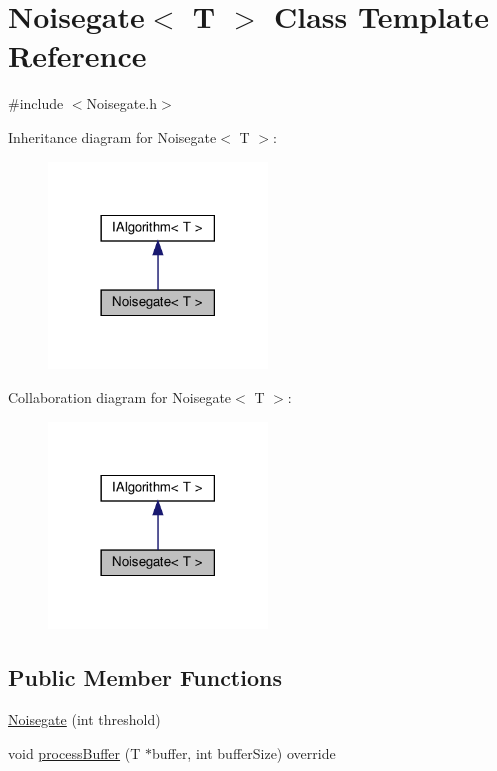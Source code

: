 \hypertarget{classNoisegate}{}\section{Noisegate$<$ T $>$ Class Template Reference}
\label{classNoisegate}


{\ttfamily \#include $<$Noisegate.\+h$>$}



Inheritance diagram for Noisegate$<$ T $>$\+:
\nopagebreak
\begin{figure}[H]
\begin{center}
\leavevmode
\includegraphics[width=165pt]{dc/d99/classNoisegate__inherit__graph}
\end{center}
\end{figure}


Collaboration diagram for Noisegate$<$ T $>$\+:
\nopagebreak
\begin{figure}[H]
\begin{center}
\leavevmode
\includegraphics[width=165pt]{da/d40/classNoisegate__coll__graph}
\end{center}
\end{figure}
\subsection*{Public Member Functions}
\begin{DoxyCompactItemize}
\item 
\hyperlink{classNoisegate_a267d2fcf1167db41c925983401af2e6f}{Noisegate} (int threshold)
\item 
void \hyperlink{classNoisegate_a4ab84c99ea64beb3015134756a358eb9}{process\+Buffer} (T $\ast$buffer, int buffer\+Size) override
\end{DoxyCompactItemize}


